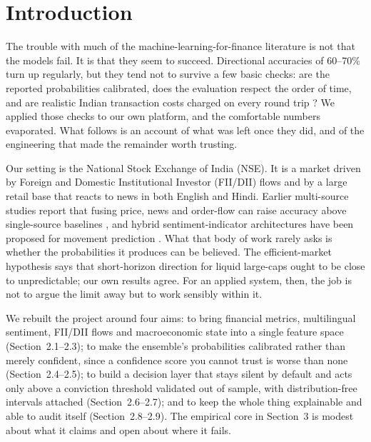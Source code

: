 \documentclass[12pt,a4paper]{article}
\begin{document}
\section{Introduction}

The trouble with much of the machine-learning-for-finance literature is not that
the models fail. It is that they seem to succeed. Directional accuracies of
60--70\% turn up regularly, but they tend not to survive a few basic checks: are
the reported probabilities calibrated, does the evaluation respect the order of
time, and are realistic Indian transaction costs charged on every round trip
\cite{r_liu}? We applied those checks to our own platform, and the comfortable
numbers evaporated. What follows is an account of what was left once they did,
and of the engineering that made the remainder worth trusting.

Our setting is the National Stock Exchange of India (NSE). It is a market driven
by Foreign and Domestic Institutional Investor (FII/DII) flows and by a large
retail base that reacts to news in both English and Hindi. Earlier multi-source
studies report that fusing price, news and order-flow can raise accuracy above
single-source baselines \cite{r_nti,r_long,r_fu}, and hybrid sentiment-indicator
architectures have been proposed for movement prediction \cite{r_moodi,r_farhadi}.
What that body of work rarely asks is whether the probabilities it produces can be
believed. The efficient-market hypothesis \cite{r_fama} says that short-horizon
direction for liquid large-caps ought to be close to unpredictable; our own results
agree. For an applied system, then, the job is not to argue the limit away but to
work sensibly within it.

We rebuilt the project around four aims: to bring financial metrics, multilingual
sentiment, FII/DII flows and macroeconomic state into a single feature space
(Section~2.1--2.3); to make the ensemble's probabilities calibrated rather than
merely confident, since a confidence score you cannot trust is worse than none
(Section~2.4--2.5); to build a decision layer that stays silent by default and acts
only above a conviction threshold validated out of sample, with distribution-free
intervals attached (Section~2.6--2.7); and to keep the whole thing explainable and
able to audit itself (Section~2.8--2.9). The empirical core in Section~3 is modest
about what it claims and open about where it fails.
\end{document}
